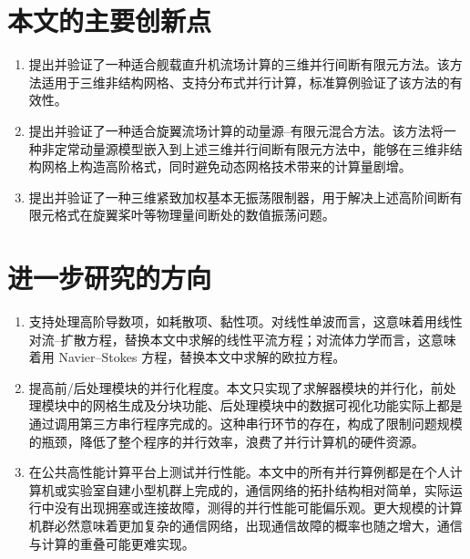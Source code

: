 \section*{本文的主要创新点}
\begin{enumerate}[wide]
\item 提出并验证了一种适合舰载直升机流场计算的三维并行间断有限元方法。该方法适用于三维非结构网格、支持分布式并行计算，标准算例验证了该方法的有效性。
\item 提出并验证了一种适合旋翼流场计算的动量源–有限元混合方法。该方法将一种非定常动量源模型嵌入到上述三维并行间断有限元方法中，能够在三维非结构网格上构造高阶格式，同时避免动态网格技术带来的计算量剧增。
\item 提出并验证了一种三维紧致加权基本无振荡限制器，用于解决上述高阶间断有限元格式在旋翼桨叶等物理量间断处的数值振荡问题。
\end{enumerate}


\section*{进一步研究的方向}
\begin{enumerate}[wide]
\item 支持处理高阶导数项，如耗散项、黏性项。对线性单波而言，这意味着用线性对流–扩散方程，替换本文中求解的线性平流方程；对流体力学而言，这意味着用
Navier–Stokes 方程，替换本文中求解的欧拉方程。 
\item 提高前/后处理模块的并行化程度。本文只实现了求解器模块的并行化，前处理模块中的网格生成及分块功能、后处理模块中的数据可视化功能实际上都是通过调用第三方串行程序完成的。这种串行环节的存在，构成了限制问题规模的瓶颈，降低了整个程序的并行效率，浪费了并行计算机的硬件资源。
\item 在公共高性能计算平台上测试并行性能。本文中的所有并行算例都是在个人计算机或实验室自建小型机群上完成的，通信网络的拓扑结构相对简单，实际运行中没有出现拥塞或连接故障，测得的并行性能可能偏乐观。更大规模的计算机群必然意味着更加复杂的通信网络，出现通信故障的概率也随之增大，通信与计算的重叠可能更难实现。
\end{enumerate}
